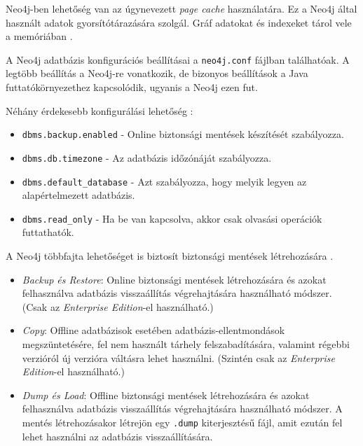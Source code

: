 Neo4j-ben lehetőség van az úgynevezett \textit{page cache} használatára. Ez a Neo4j által használt adatok gyorsítótárazására szolgál. Gráf adatokat és indexeket tárol vele a memóriában \cite{neo4j-page-cache}.

A Neo4j adatbázis konfigurációs beállításai a \texttt{neo4j.conf} fájlban találhatóak. A legtöbb beállítás a Neo4j-re vonatkozik, de bizonyos beállítások a Java futtatókörnyezethez kapcsolódik, ugyanis a Neo4j ezen fut.

Néhány érdekesebb konfigurálási lehetőség \cite{neo4j-config-settings}:
\begin{itemize}
    \item \texttt{dbms.backup.enabled} - Online biztonsági mentések készítését szabályozza.
    \item \texttt{dbms.db.timezone} - Az adatbázis időzónáját szabályozza.
    \item \texttt{dbms.default\_database} - Azt szabályozza, hogy melyik legyen az alapértelmezett adatbázis.
    \item \texttt{dbms.read\_only} - Ha be van kapcsolva, akkor csak olvasási operációk futtathatók.
\end{itemize}





A Neo4j többfajta lehetőséget is biztosít biztonsági mentések létrehozására \cite{neo4j-backup}.

\begin{itemize}
    \item \textit{Backup és Restore}: Online biztonsági mentések létrehozására és azokat felhasználva adatbázis visszaállítás végrehajtására használható módszer. (Csak az \textit{Enterprise Edition}-el használható.)
    \item \textit{Copy}: Offline adatbázisok esetében adatbázis-ellentmondások megszüntetésére, fel nem használt tárhely felszabadítására, valamint régebbi verzióról új verzióra váltásra lehet használni. (Szintén csak az \textit{Enterprise Edition}-el használható.)
    \item \textit{Dump és Load}: Offline biztonsági mentések létrehozására és azokat felhasználva adatbázis visszaállítás végrehajtására használható módszer. A mentés létrehozásakor létrejön egy \texttt{.dump} kiterjesztésű fájl, amit ezután fel lehet használni az adatbázis visszaállítására.
\end{itemize}